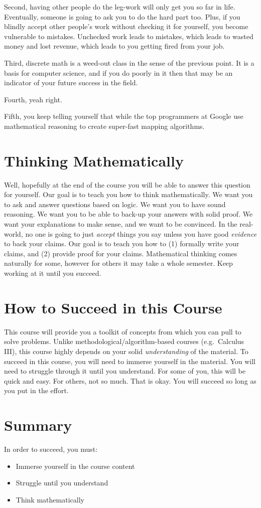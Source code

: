 \documentclass[main.tex]{subfiles}
\begin{document}
Second, having other people do the leg-work will only get you so far in life. Eventually, someone is going to ask you to do the hard part too. Plus, if you blindly accept other people's work without checking it for yourself, you become vulnerable to mistakes. Unchecked work leads to mistakes, which leads to wasted money and lost revenue, which leads to you getting fired from your job.

Third, discrete math is a weed-out class in the sense of the previous point. It is a basis for computer science, and if you do poorly in it then that may be an indicator of your future success in the field.

Fourth, yeah right.

Fifth, you keep telling yourself that while the top programmers at Google use mathematical reasoning to create super-fast mapping algorithms.

\section{Thinking Mathematically}

Well, hopefully at the end of the course you will be able to answer this question for yourself. Our goal is to teach you how to think mathematically. We want you to ask and answer questions based on logic. We want you to have sound reasoning. We want you to be able to back-up your answers with solid proof. We want your explanations to make sense, and we want to be convinced. In the real-world, no one is going to just \textit{accept} things you say unless you have good \textit{evidence} to back your claims. Our goal is to teach you how to (1) formally write your claims, and (2) provide proof for your claims. Mathematical thinking comes naturally for some, however for others it may take a whole semester. Keep working at it until you succeed.

\section{How to Succeed in this Course}

This course will provide you a toolkit of concepts from which you can pull to solve problems. Unlike methodological/algorithm-based courses (e.g.\ Calculus III), this course highly depends on your solid \textit{understanding} of the material. To succeed in this course, you will need to immerse yourself in the material. You will need to struggle through it until you understand. For some of you, this will be quick and easy. For others, not so much. That is okay. You will succeed so long as you put in the effort.

\section{Summary}

In order to succeed, you must:
\begin{itemize}
	\item Immerse yourself in the course content
	\item Struggle until you understand
	\item Think mathematically
\end{itemize}
\end{document}
